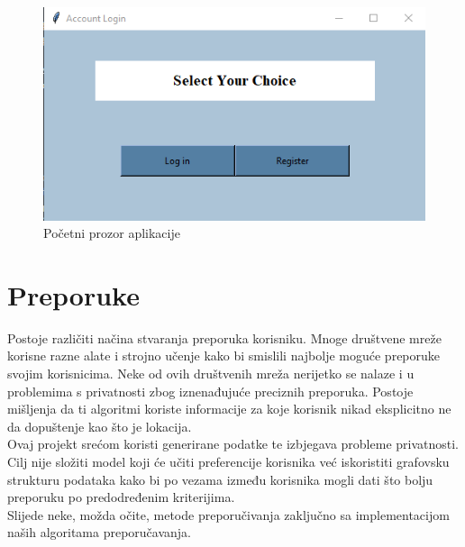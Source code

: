 \documentclass[titlepage, 12pt]{scrartcl}
\begin{document}
	\begin{figure}[h]
		\begin{center}
			\includegraphics[scale=0.8]{slike/main.png}
			\caption{Početni prozor aplikacije}
			\label{fig:main} 
		\end{center}
	\end{figure}
	
	
	\newpage
	
	\section{Preporuke}
	Postoje različiti načina stvaranja preporuka korisniku. Mnoge društvene mreže korisne razne alate i strojno učenje kako bi smislili najbolje moguće preporuke svojim korisnicima.
	Neke od ovih društvenih mreža nerijetko se nalaze i u problemima s privatnosti zbog iznenađujuće preciznih preporuka.
	Postoje mišljenja da ti algoritmi koriste informacije za koje korisnik nikad eksplicitno ne da dopuštenje kao što je lokacija. \\
	Ovaj projekt srećom koristi generirane podatke te izbjegava probleme privatnosti. Cilj nije složiti model koji će učiti preferencije korisnika već iskoristiti grafovsku strukturu podataka kako bi po vezama između korisnika mogli dati što bolju preporuku po predodređenim kriterijima. \\
	Slijede neke, možda očite, metode preporučivanja zaključno sa implementacijom naših algoritama preporučavanja.
	
\end{document}
